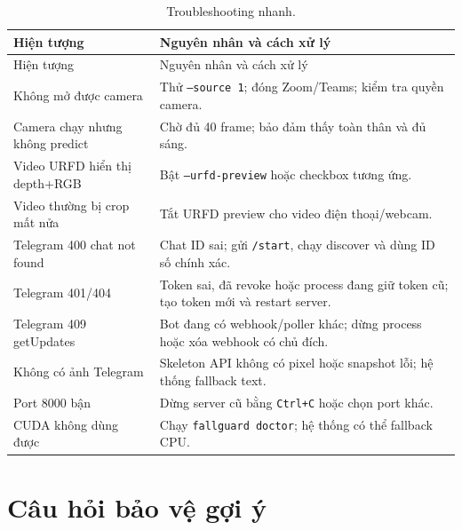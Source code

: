 \documentclass[12pt,a4paper,oneside]{report}
\newcommand{\code}[1]{\texttt{#1}}
\begin{document}
\begin{longtable}{p{5cm}p{9.3cm}}
\caption{Troubleshooting nhanh.}\\
\toprule
Hiện tượng & Nguyên nhân và cách xử lý \\
\midrule
\endfirsthead
\toprule
Hiện tượng & Nguyên nhân và cách xử lý \\
\midrule
\endhead
Không mở được camera & Thử \code{--source 1}; đóng Zoom/Teams; kiểm tra quyền camera. \\
Camera chạy nhưng không predict & Chờ đủ 40 frame; bảo đảm thấy toàn thân và đủ sáng. \\
Video URFD hiển thị depth+RGB & Bật \code{--urfd-preview} hoặc checkbox tương ứng. \\
Video thường bị crop mất nửa & Tắt URFD preview cho video điện thoại/webcam. \\
Telegram 400 chat not found & Chat ID sai; gửi \code{/start}, chạy discover và dùng ID số chính xác. \\
Telegram 401/404 & Token sai, đã revoke hoặc process đang giữ token cũ; tạo token mới và restart server. \\
Telegram 409 getUpdates & Bot đang có webhook/poller khác; dừng process hoặc xóa webhook có chủ đích. \\
Không có ảnh Telegram & Skeleton API không có pixel hoặc snapshot lỗi; hệ thống fallback text. \\
Port 8000 bận & Dừng server cũ bằng \code{Ctrl+C} hoặc chọn port khác. \\
CUDA không dùng được & Chạy \code{fallguard doctor}; hệ thống có thể fallback CPU. \\
\bottomrule
\end{longtable}

\chapter{Câu hỏi bảo vệ gợi ý}
\end{document}

